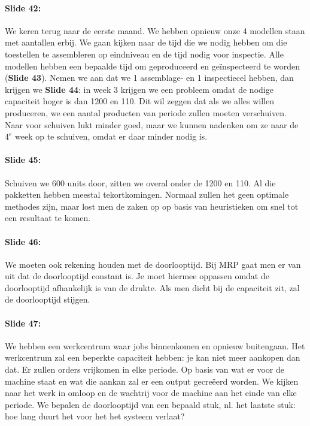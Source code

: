 \documentclass[10pt,a4paper]{report}
\begin{document}
\paragraph{Slide 42:} We keren terug naar de eerste maand. We hebben opnieuw onze 4 modellen staan met aantallen erbij. We gaan kijken naar de tijd die we nodig hebben om die toestellen te assembleren op eindniveau en de tijd nodig voor inspectie. Alle modellen hebben een bepaalde tijd om geproduceerd en ge\"inspecteerd te worden (\textbf{Slide 43}). Nemen we aan dat we 1 assemblage- en 1 inspectiecel hebben, dan krijgen we \textbf{Slide 44}: in week 3 krijgen we een probleem omdat de nodige capaciteit hoger is dan 1200 en 110. Dit wil zeggen dat als we alles willen produceren, we een aantal producten van periode zullen moeten verschuiven. Naar voor schuiven lukt minder goed, maar we kunnen nadenken om ze naar de $4^{e}$ week op te schuiven, omdat er daar minder nodig is. 

\paragraph{Slide 45:} Schuiven we 600 units door, zitten we overal onder de 1200 en 110. Al die pakketten hebben meestal tekortkomingen. Normaal zullen het geen optimale methodes zijn, maar lost men de zaken op op basis van heuristieken om snel tot een resultaat te komen.

\paragraph{Slide 46:} We moeten ook rekening houden met de doorlooptijd. Bij MRP gaat men er van uit dat de doorlooptijd constant is. Je moet hiermee oppassen omdat de doorlooptijd afhankelijk is van de drukte. Als men dicht bij de capaciteit zit, zal de doorlooptijd stijgen.

\paragraph{Slide 47:} We hebben een werkcentrum waar jobs binnenkomen en opnieuw buitengaan. Het werkcentrum zal een beperkte capaciteit hebben: je kan niet meer aankopen dan dat. Er zullen orders vrijkomen in elke periode. Op basis van wat er voor de machine staat en wat die aankan zal er een output gecre\"eerd worden. We kijken naar het werk in omloop en de wachtrij voor de machine aan het einde van elke periode. We bepalen de doorlooptijd van een bepaald stuk, nl. het laatste stuk: hoe lang duurt het voor het het systeem verlaat?
\end{document}

